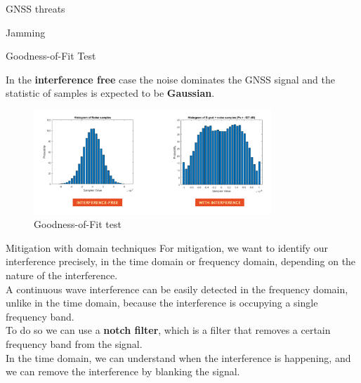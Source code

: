 \begin{section}{GNSS threats}
\begin{subsection}{Jamming}
\begin{subsubsection}{Goodness-of-Fit Test}
          \begin{boxH}
            In the \textbf{interference free} case the noise dominates the GNSS signal and the statistic of 
            samples is expected to be \textbf{Gaussian}.
          \end{boxH}

          \begin{figure}[h]
            \centering
            \includegraphics[width=0.8\textwidth]{img/wireless/good to fit test.png}
            \caption{Goodness-of-Fit test}
            \label{fig:GNSS goodness of fit}
          \end{figure}


        \end{subsubsection}

      \end{subsection}
      \begin{subsection}{Mitigation with domain techniques}
        For mitigation, we want to identify our interference precisely, in the time domain
        or frequency domain, depending on the nature of the interference.\\
        A continuous wave interference can be easily detected in the frequency domain, unlike in the 
        time domain, because the interference is occupying a single frequency band.\\

        To do so we can use a \textbf{notch filter}, which is a filter that removes a certain
        frequency band from the signal.\\

        In the time domain, we can understand when the interference is happening, and we can
        remove the interference by blanking the signal.\
      \end{subsection}
    \end{section}

